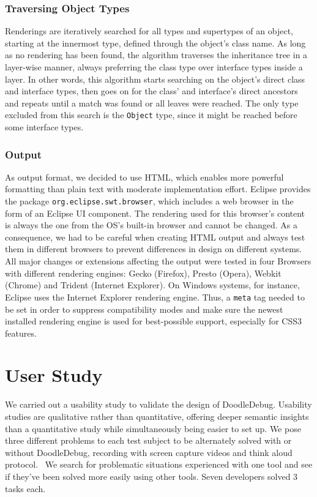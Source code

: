 \documentclass[english]{scrartcl}
\newcommand{\nb}[2]{\nbc{#1}{#2}{orange}}
\newcommand\todo[1]{\nb{TO DO}{#1}}
\newcommand{\DD}{Dood\-le\-De\-bug\xspace}
\begin{document}
\subsubsection{Traversing Object Types}
Renderings are iteratively searched for all types and supertypes of an object, starting at the innermost type, defined through the object's class name.
As long as no rendering has been found, the algorithm traverses the inheritance tree in a layer-wise manner, always preferring the class type over interface types inside a layer.
In other words, this algorithm starts searching on the object's direct class and interface types, then goes on for the class' and interface's direct ancestors and repeats until a match was found or all leaves were reached.
The only type excluded from this search is the \texttt{Object} type, since it might be reached before some interface types.

\subsubsection{Output}
As output format, we decided to use HTML, which enables more powerful formatting than plain text with moderate implementation effort.
Eclipse provides the package \texttt{org.eclipse.swt.browser}, which includes a web browser in the form of an Eclipse UI component.
The rendering used for this browser's content is always the one from the OS's built-in browser and cannot be changed.
As a consequence, we had to be careful when creating HTML output and always test them in different browsers to prevent differences in design on different systems.
All major changes or extensions affecting the output were tested in four Browsers with different rendering engines: Gecko (Firefox), Presto (Opera), Webkit (Chrome) and Trident (Internet Explorer).
On Windows systems, for instance, Eclipse uses the Internet Explorer rendering engine.
Thus, a \texttt{meta} tag needed to be set in order to suppress compatibility modes and make sure the newest installed rendering engine is used for best-possible support, especially for CSS3 features.


\section{User Study}
\todo{Get stuff from paper}

We carried out a usability study \cite{Krug00a} to validate the design of \DD.
Usability studies are qualitative rather than quantitative, offering deeper semantic insights~\cite[pp. 13--15]{Lang09b} than a quantitative study while simultaneously being easier to set up.
We pose three different problems to each test subject to be alternately solved with or without DoodleDebug, recording with screen capture videos and think aloud protocol.~\cite{Krug00a,Lang09b}
We search for problematic situations experienced with one tool and see if they've been solved more easily using other tools.
Seven developers solved 3 tasks each.
\end{document}
